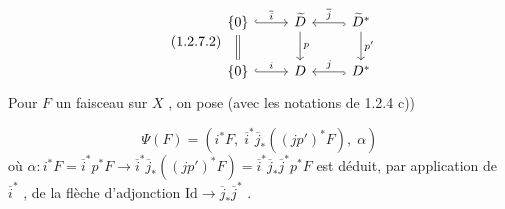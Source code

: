 \begin{equation}\tag{1.2.7.2}
\begin{tikzcd}
\{0\} \arrow[r, hook, "\overline{i}"] \arrow[d, equal] & \widetilde{D} \arrow[d, "p"] & \widetilde{D}^* \arrow[l, hook, "\overline{j}"'] \arrow[d, "p'"] \\
\{0\} \arrow[r, hook, "i"] & D & D^* \arrow[l, hook, "j"']
\end{tikzcd}
\end{equation}
Pour $F$ un faisceau sur $X$ , on pose (avec les notations de 1.2.4 c))

\begin{equation*}
\Psi(F) = (i^*F, \; \overline{i}^*\overline{j}_*((jp')^* F), \; \alpha)
\end{equation*}
où $\alpha : i^*F = \overline{i}^* p^* F \longrightarrow \overline{i}^* \overline{j}_* ((jp')^* F) = \overline{i}^* \overline{j}_* \overline{j}^* p^* F$ est déduit, par application de $\overline{i}^*$ , de la flèche d'adjonction $\mathrm{Id} \to \overline{j}_* \overline{j}^*$ .

